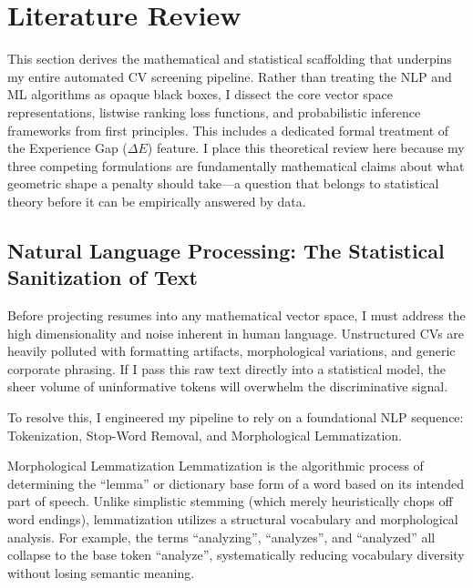 \chapter{Literature Review}
\label{ch:literature_review}

This section derives the mathematical and statistical scaffolding that underpins my entire automated CV screening pipeline. Rather than treating the NLP and ML algorithms as opaque black boxes, I dissect the core vector space representations, listwise ranking loss functions, and probabilistic inference frameworks from first principles. This includes a dedicated formal treatment of the Experience Gap ($\Delta E$) feature. I place this theoretical review here because my three competing formulations are fundamentally mathematical claims about what geometric shape a penalty should take---a question that belongs to statistical theory before it can be empirically answered by data.

\section{Natural Language Processing: The Statistical Sanitization of Text}
\label{sec:nlp_foundations}

Before projecting resumes into any mathematical vector space, I must address the high dimensionality and noise inherent in human language. Unstructured CVs are heavily polluted with formatting artifacts, morphological variations, and generic corporate phrasing. If I pass this raw text directly into a statistical model, the sheer volume of uninformative tokens will overwhelm the discriminative signal.

To resolve this, I engineered my pipeline to rely on a foundational NLP sequence: Tokenization, Stop-Word Removal, and Morphological Lemmatization.

\begin{definitionbox}{Morphological Lemmatization}
Lemmatization is the algorithmic process of determining the ``lemma'' or dictionary base form of a word based on its intended part of speech. Unlike simplistic stemming (which merely heuristically chops off word endings), lemmatization utilizes a structural vocabulary and morphological analysis. For example, the terms ``analyzing'', ``analyzes'', and ``analyzed'' all collapse to the base token ``analyze'', systematically reducing vocabulary diversity without losing semantic meaning.
\end{definitionbox}

